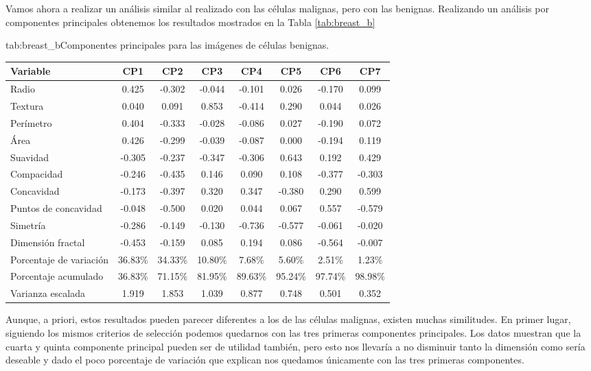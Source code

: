 \documentclass[tfg,cienciasbased,lot,lof,covers,final,overleaf,nocopyright]{tfgtfmthesisuam}
\begin{document}
Vamos ahora a realizar un análisis similar al realizado con las células malignas, pero con las benignas. Realizando un análisis por componentes principales obtenemos los resultados mostrados en la Tabla \ref{tab:breast_b}

\begin{table}{tab:breast_b}{Componentes principales para las imágenes de células benignas.}
    \begin{tabular}{lccccccc}
        \toprule \textbf{Variable} & \textbf{CP1} & \textbf{CP2} & \textbf{CP3} & \textbf{CP4} & \textbf{CP5} & \textbf{CP6} & \textbf{CP7}\\
        \midrule
        Radio & 0.425 & -0.302 & -0.044 & -0.101 &  0.026 & -0.170 &  0.099\\
        Textura & 0.040 &  0.091 &  0.853 & -0.414 &  0.290 &  0.044 &  0.026\\
        Perímetro & 0.404 & -0.333 & -0.028 & -0.086 &  0.027 & -0.190 &  0.072\\
        Área & 0.426 & -0.299 & -0.039 & -0.087 &  0.000 & -0.194 &  0.119\\
        Suavidad & -0.305 & -0.237 & -0.347 & -0.306 &  0.643 &  0.192 &  0.429\\
        Compacidad & -0.246 & -0.435 &  0.146 &  0.090 &  0.108 & -0.377 & -0.303\\
        Concavidad & -0.173 & -0.397 &  0.320 &  0.347 & -0.380 &  0.290 &  0.599\\
        Puntos de concavidad & -0.048 & -0.500 &  0.020 &  0.044 &  0.067 &  0.557 & -0.579\\
        Simetría & -0.286 & -0.149 & -0.130 & -0.736 & -0.577 & -0.061 & -0.020\\
        Dimensión fractal & -0.453 & -0.159 &  0.085 &  0.194 &  0.086 & -0.564 & -0.007\\
        \midrule Porcentaje de variación & 36.83\% & 34.33\% & 10.80\% & 7.68\% & 5.60\% & 2.51\% & 1.23\%\\
        Porcentaje acumulado & 36.83\% & 71.15\% & 81.95\% & 89.63\% & 95.24\% & 97.74\% & 98.98\%\\
        Varianza escalada & 1.919 & 1.853 & 1.039 & 0.877 & 0.748 & 0.501 & 0.352\\
        \bottomrule
    \end{tabular}
\end{table}

Aunque, a priori, estos resultados pueden parecer diferentes a los de las células malignas, existen muchas similitudes. En primer lugar, siguiendo los mismos criterios de selección podemos quedarnos con las tres primeras componentes principales. Los datos muestran que la cuarta y quinta componente principal pueden ser de utilidad también, pero esto nos llevaría a no disminuir tanto la dimensión como sería deseable y dado el poco porcentaje de variación que explican nos quedamos únicamente con las tres primeras componentes.
\end{document}
